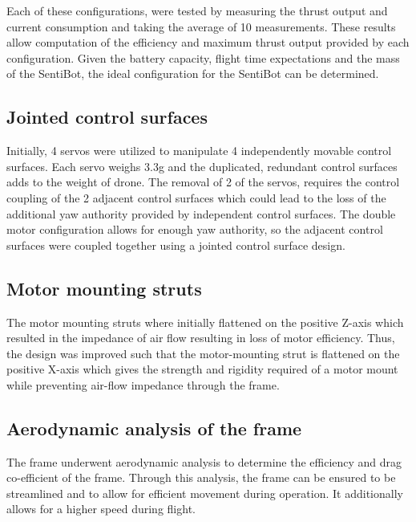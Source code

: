 \documentclass[12pt]{article}
\begin{document}
Each of these configurations, were tested by measuring the thrust output and current consumption and taking the average of 10 measurements. These results allow computation of the efficiency and maximum thrust output provided by each configuration. Given the battery capacity, flight time expectations and the mass of the SentiBot, the ideal configuration for the SentiBot can be determined.

\subsection{Jointed control surfaces}

Initially, 4 servos were utilized to manipulate 4 independently movable control surfaces. Each servo weighs 3.3g and the duplicated, redundant control surfaces adds to the weight of drone. The removal of 2 of the servos, requires the control coupling of the 2 adjacent control surfaces which could lead to the loss of the additional yaw authority provided by independent control surfaces. The double motor configuration allows for enough yaw authority, so the adjacent control surfaces were coupled together using a jointed control surface design.

\subsection{Motor mounting struts}

The motor mounting struts where initially flattened on the positive Z-axis which resulted in the impedance of air flow resulting in loss of motor efficiency. Thus, the design was improved such that the motor-mounting strut is flattened on the positive X-axis which gives the strength and rigidity required of a motor mount while preventing air-flow impedance through the frame.

\subsection{Aerodynamic analysis of the frame}

The frame underwent aerodynamic analysis to determine the efficiency and drag co-efficient of the frame. Through this analysis, the frame can be ensured to be streamlined and to allow for efficient movement during operation. It additionally allows for a higher speed during flight.
\end{document}
